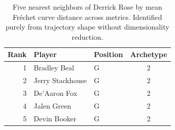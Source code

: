 \begin{table}[htbp]
  \centering\small
  \begin{tabular}{rllc}
    \toprule
    Rank & Player & Position & Archetype \\
    \midrule
    1 & Bradley Beal & G & 2 \\
    2 & Jerry Stackhouse & G & 2 \\
    3 & De'Aaron Fox & G & 2 \\
    4 & Jalen Green & G & 2 \\
    5 & Devin Booker & G & 2 \\
    \bottomrule
  \end{tabular}
  \caption{Five nearest neighbors of Derrick Rose by mean Fr\'{e}chet curve distance across metrics. Identified purely from trajectory shape without dimensionality reduction.}
  \label{tab:Derrick_Rose_frechet_curve_neighbors}
\end{table}

